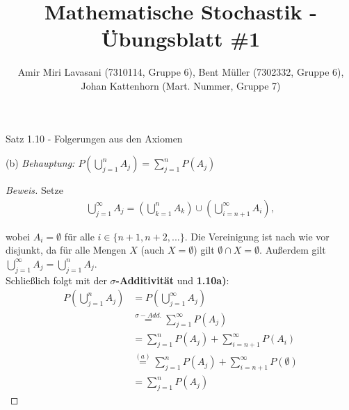 \documentclass[10pt]{article}
\newenvironment{Aufgabe}[2][Aufgabe]{\begin{trivlist}
\item[\hskip \labelsep {\bfseries #1}\hskip \labelsep {\bfseries #2.}]}{\end{trivlist}}
\begin{document}
 
\title{ \textbf{Mathematische Stochastik - Übungsblatt \#1} }

\author{Amir Miri Lavasani (7310114, Gruppe 6), Bent Müller (7302332, Gruppe 6), \\ 
Johan Kattenhorn (Mart. Nummer, Gruppe 7)} \maketitle

 
\begin{Aufgabe}{1}
    Satz 1.10 - Folgerungen aus den Axiomen
\end{Aufgabe}

(b) \textit{ Behauptung: $ P\left( \bigcup\limits_{j=1}^{n} A_j \right) = \sum\limits_{j=1}^{n} P(A_j) $ }
\begin{proof}[Beweis]
Setze  
\begin{align*}
    \bigcup\limits_{j=1}^{\infty} A_j = \left( \bigcup\limits_{k=1}^{n} A_k \right) \cup \left( \bigcup\limits_{i=n+1}^{\infty} A_i \right),
\end{align*}

wobei $A_i = \emptyset $ für alle $i\in\{n+1,n+2,...\}$. Die Vereinigung ist nach wie vor disjunkt, da für alle Mengen $X$ (auch $X=\emptyset$) gilt 
$\emptyset \cap X = \emptyset$. Außerdem gilt $ \bigcup\limits_{j=1}^{\infty} A_j = \bigcup\limits_{j=1}^{n} A_j $. \\
Schließlich folgt mit der \textbf{$\sigma$-Additivität} und \textbf{1.10a)}:
\begin{align*}
    P\left( \bigcup\limits_{j=1}^{n} A_j \right) &= P\left( \bigcup\limits_{j=1}^{\infty} A_j \right) \\
                                                 &\stackrel{\sigma-Add.}{=} \sum\limits_{j=1}^{\infty} P(A_j) \\
                                                 &= \sum\limits_{j=1}^{n} P(A_j) + \sum\limits_{i=n+1}^{\infty} P(A_i) \\
                                                 &\stackrel{(a)}{=} \sum\limits_{j=1}^{n} P(A_j) + \sum\limits_{i=n+1}^{\infty} P(\emptyset) \\ 
                                                 &= \sum\limits_{j=1}^{n} P(A_j) 
\end{align*}

\end{proof}
\end{document}
